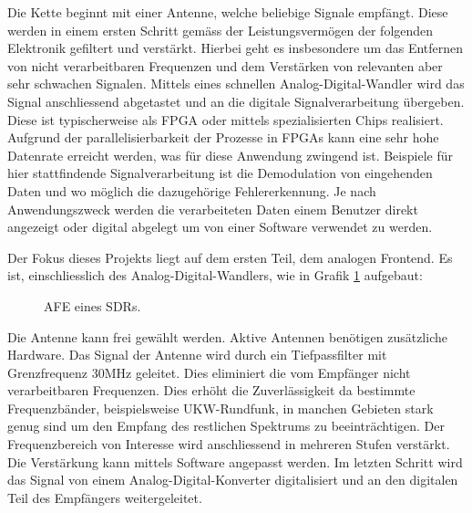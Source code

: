 Die Kette beginnt mit einer Antenne, welche beliebige Signale empfängt. Diese werden in einem ersten Schritt gemäss der Leistungsvermögen der folgenden Elektronik gefiltert und verstärkt. Hierbei geht es insbesondere um das Entfernen von nicht verarbeitbaren Frequenzen und dem Verstärken von relevanten aber sehr schwachen Signalen. Mittels eines schnellen Analog-Digital-Wandler wird das Signal anschliessend abgetastet und an die digitale Signalverarbeitung übergeben. Diese ist typischerweise als FPGA oder mittels spezialisierten Chips realisiert. Aufgrund der parallelisierbarkeit der Prozesse in FPGAs kann eine sehr hohe Datenrate erreicht werden, was für diese Anwendung zwingend ist. Beispiele für hier stattfindende Signalverarbeitung ist die Demodulation von eingehenden Daten und wo möglich die dazugehörige Fehlererkennung. Je nach Anwendungszweck werden die verarbeiteten Daten einem Benutzer direkt angezeigt oder digital abgelegt um von einer Software verwendet zu werden.

Der Fokus dieses Projekts liegt auf dem ersten Teil, dem analogen Frontend. Es ist, einschliesslich des Analog-Digital-Wandlers, wie in Grafik \ref{fig:AFE_aufbau} aufgebaut:

\begin{figure}[H]
\begin{center}
    \caption{AFE eines SDRs.}
    \label{fig:AFE_aufbau}
\end{center}
\end{figure}

Die Antenne kann frei gewählt werden. Aktive Antennen benötigen zusätzliche Hardware. Das Signal der Antenne wird durch ein Tiefpassfilter mit Grenzfrequenz 30MHz geleitet. Dies eliminiert die vom Empfänger nicht verarbeitbaren Frequenzen. Dies erhöht die Zuverlässigkeit da bestimmte Frequenzbänder, beispielsweise UKW-Rundfunk, in manchen Gebieten stark genug sind um den Empfang des restlichen Spektrums zu beeinträchtigen.
Der Frequenzbereich von Interesse wird anschliessend in mehreren Stufen verstärkt. Die Verstärkung kann mittels Software angepasst werden. Im letzten Schritt wird das Signal von einem Analog-Digital-Konverter digitalisiert und an den digitalen Teil des Empfängers weitergeleitet.